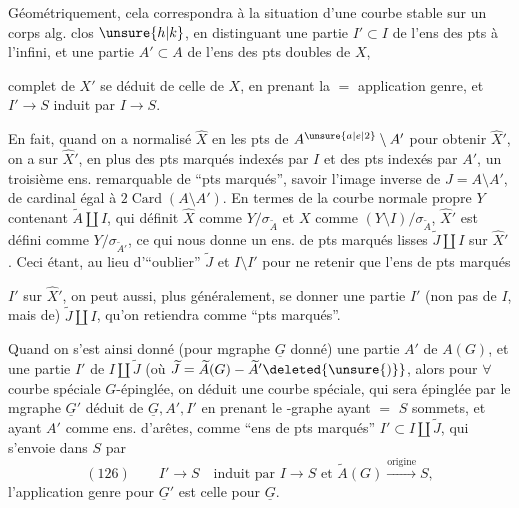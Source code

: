 Géométriquement, cela correspondra à la situation d'une courbe stable
sur un corps alg. clos $\unsure{h|k}$, en distinguant une partie $I'\subset I$
de l'ens des pts à l'infini, et une partie $A'\subset A$ de l'ens des pts doubles de $X$,

complet de $X'$ se déduit de celle de $X$, en prenant la $=$ application genre, et $I'\longrightarrow S$ induit par $I\longrightarrow S$.

En fait, quand on a normalisé $\widehat X$ en les pts de $A^{\unsure{a|e|2}}\setminus A'$ pour obtenir $\widehat X'$, on a sur $\widehat X'$, en plus des pts marqués indexés par $I$ et des pts  indexés par $A'$, un troisième ens. remarquable de ``pts marqués'', savoir l'image inverse  de $J=A\setminus A'$,  de cardinal égal à $2\operatorname{Card}(A\setminus A')$. En termes de la courbe normale propre $Y$  contenant $\widetilde A\amalg I$, qui définit $\widehat X$ comme $Y/\sigma_{\widetilde A}$ et $X$ comme $(Y\setminus I)/\sigma_{\widetilde A}$, $\widehat X'$ est défini comme $Y/\sigma_{\widetilde A'}$, ce qui nous donne un ens. de pts marqués lisses  $\widetilde J\amalg I$ sur $\widehat X'$. Ceci étant, au lieu d'``oublier'' $\widetilde J$ et $I\setminus I'$ pour ne retenir que l'ens de pts marqués

$I'$ sur $\widehat X'$, on peut aussi, plus généralement, se donner une partie $I'$ (non pas de $I$, mais de) $\widetilde J\amalg I$, qu'on retiendra comme ``pts marqués''.

Quand on s'est ainsi donné (pour  mgraphe $\underline G$ donné) une partie $A'$ de $A(G)$, et une partie $I'$ de $I\amalg\widetilde J$ (où $\widetilde J=\widetilde A(G)-\widetilde A'\deleted{\unsure{)}}$, alors pour $\forall$ courbe spéciale $G$-épinglée, on déduit une courbe spéciale, qui sera épinglée par le mgraphe $\underline G'$ déduit de $\underline G,A',I'$ en prenant le -graphe  ayant $=$ $S$ sommets, et ayant $A'$ comme ens. d'arêtes,  comme ``ens de pts marqués'' $I'\subset I\amalg\widetilde J$, qui s'envoie dans $S$  par
\[
(126)\qquad I'\longrightarrow S\quad\text{induit par }I\longrightarrow S\text{ et }\widetilde A(G)\xrightarrow{\text{origine}}S,
\]
l'application genre pour $\underline G'$ est celle pour $\underline G$.

